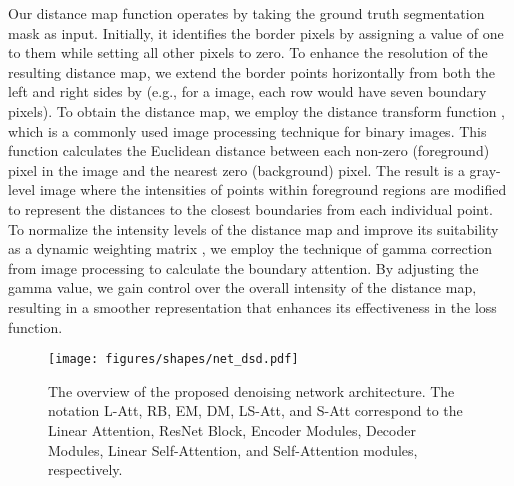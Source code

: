 \documentclass[runningheads]{llncs}
\begin{document}
Our distance map function operates by taking the ground truth segmentation mask as input. Initially, it identifies the border pixels by assigning a value of one to them while setting all other pixels to zero. To enhance the resolution of the resulting distance map, we extend the border points horizontally from both the left and right sides by  (e.g., for a  image, each row would have seven boundary pixels). To obtain the distance map, we employ the distance transform function \cite{kimmel1996sub}, which is a commonly used image processing technique for binary images. This function calculates the Euclidean distance between each non-zero (foreground) pixel in the image and the nearest zero (background) pixel. The result is a gray-level image where the intensities of points within foreground regions are modified to represent the distances to the closest boundaries from each individual point. To normalize the intensity levels of the distance map and improve its suitability as a dynamic weighting matrix , we employ the technique of gamma correction from image processing to calculate the boundary attention. By adjusting the gamma value, we gain control over the overall intensity of the distance map, resulting in a smoother representation that enhances its effectiveness in the loss function.

\begin{figure}[!t]
    
    \centering
    \texttt{[image: figures/shapes/net\_dsd.pdf]}
    \caption{The overview of the proposed denoising network architecture. The notation L-Att, RB, EM, DM, LS-Att, and S-Att correspond to the Linear Attention, ResNet Block, Encoder Modules, Decoder Modules, Linear Self-Attention, and Self-Attention modules, respectively.}
    
    \label{fig:network}
\end{figure}
\end{document}
